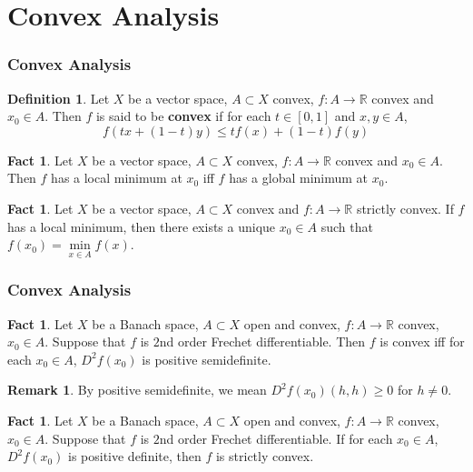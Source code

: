 \documentclass[notheorems]{beamer}
\theoremstyle{definition}
\newtheorem{defn}[definition]{Definition}
\newtheorem{fact}[definition]{Fact}
\newtheorem{rem}[definition]{Remark}
\newcommand{\R}{\mathbb{R}}
\begin{document}
\section{Convex Analysis}

\begin{frame}
\frametitle{Convex Analysis}


\begin{defn}
Let $X$ be a vector space, $A \subset X$ convex, $f:A \rightarrow \R$ convex and $x_0 \in A$. Then $f$ is said to be \textbf{convex} if for each $t \in [0,1]$ and $x,y \in A$, $$f(tx + (1-t)y) \leq tf(x) + (1-t)f(y)$$
\end{defn}

\pause
\begin{fact}
Let $X$ be a vector space, $A \subset X$ convex, $f:A \rightarrow \R$ convex and $x_0 \in A$. Then $f$ has a local minimum at $x_0$ iff $f$ has a global minimum at $x_0$.
\end{fact}

\pause
\begin{fact}
Let $X$ be a vector space, $A \subset X$ convex and $f:A \rightarrow \R$ strictly convex. If $f$ has a local minimum, then there exists a unique $x_0 \in A$ such that $f(x_0) = \min\limits_{x \in A}f(x)$.
\end{fact}



\end{frame}


















\begin{frame}
\frametitle{Convex Analysis}


\begin{fact}
Let $X$ be a Banach space, $A \subset X$ open and convex, $f:A \rightarrow \R$ convex, $x_0 \in A$. Suppose that $f$ is $2$nd order Frechet differentiable. Then $f$ is convex iff for each $x_0 \in A$, $D^2f(x_0)$ is positive semidefinite. 
\end{fact}

\begin{rem}
By positive semidefinite, we mean $D^2f(x_0)(h,h) \geq 0$ for $h \neq 0$.
\end{rem}


\pause
\begin{fact}
Let $X$ be a Banach space, $A \subset X$ open and convex, $f:A \rightarrow \R$ convex, $x_0 \in A$. Suppose that $f$ is $2$nd order Frechet differentiable. If for each $x_0 \in A$, $D^2f(x_0)$ is positive  definite, then $f$ is strictly convex. 
\end{fact}
\end{frame}
\end{document}
